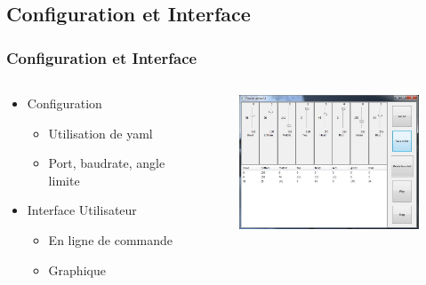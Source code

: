 \subsection{Configuration et Interface}
\begin{frame}
  \frametitle{Configuration et Interface}
  \begin{columns}[T]
    \begin{column}{.4\textwidth}
      \begin{itemize}
        \item Configuration
          \begin{itemize}
            \item Utilisation de yaml
            \item Port, baudrate, angle limite
          \end{itemize}
        \item Interface Utilisateur
          \begin{itemize}
            \item En ligne de commande
            \item Graphique
          \end{itemize}
      \end{itemize}
    \end{column}
    \begin{column}{.6\textwidth}
      \begin{figure}[ht]
        \centering
        \includegraphics[width=6cm]{../img/gui.jpg}
      \end{figure}
    \end{column}
  \end{columns}
\end{frame}
